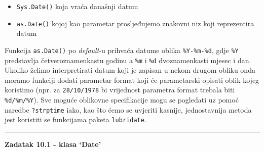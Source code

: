 \documentclass[]{book}
\newenvironment{Shaded}{\begin{snugshade}}{\end{snugshade}}
\newcommand{\KeywordTok}[1]{\textcolor[rgb]{0.13,0.29,0.53}{\textbf{#1}}}
\newcommand{\DataTypeTok}[1]{\textcolor[rgb]{0.13,0.29,0.53}{#1}}
\newcommand{\StringTok}[1]{\textcolor[rgb]{0.31,0.60,0.02}{#1}}
\newcommand{\CommentTok}[1]{\textcolor[rgb]{0.56,0.35,0.01}{\textit{#1}}}
\newcommand{\NormalTok}[1]{#1}
\providecommand{\tightlist}{%
  \setlength{\itemsep}{0pt}\setlength{\parskip}{0pt}}
\theoremstyle{definition}
\theoremstyle{definition}
\theoremstyle{definition}
\theoremstyle{remark}
\begin{document}
\begin{itemize}
\tightlist
\item
  \texttt{Sys.Date()} koja vraća današnji datum
\item
  \texttt{as.Date()} kojoj kao parametar prosljeđujemo znakovni niz koji
  reprezentira datum
\end{itemize}

Funkcija \texttt{as.Date()} po \emph{default}-u prihvaća datume oblika
\texttt{\%Y-\%m-\%d}, gdje \texttt{\%Y} predstavlja četveroznamenkastu
godinu a \texttt{\%m} i \texttt{\%d} dvoznamenkasti mjesec i dan.
Ukoliko želimo interpretirati datum koji je zapisan u nekom drugom
obliku onda moramo funkciji dodati parametar format koji će parametarski
opisati oblik kojeg koristimo (npr. za \texttt{28/10/1978} bi vrijednost
parametra format trebala biti \texttt{\%d/\%m/\%Y}). Sve moguće
oblikovne specifikacije mogu se pogledati uz pomoć naredbe
\texttt{?strptime} iako, kao što ćemo se uvjeriti kasnije, jednostavnija
metoda jest koristiti se funkcijama paketa \texttt{lubridate}.

\begin{center}\rule{0.5\linewidth}{\linethickness}\end{center}

\textbf{Zadatak 10.1 - klasa `Date'}

\begin{Shaded}
\end{Shaded}

\begin{Shaded}
\end{Shaded}
\end{document}

